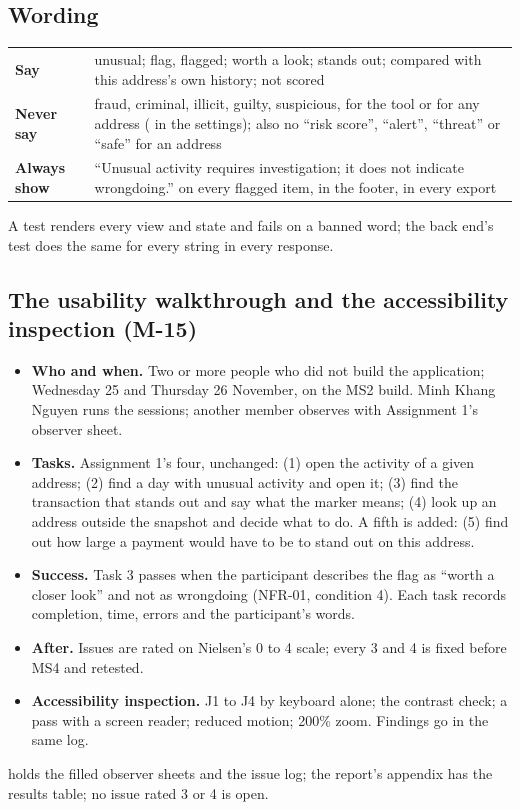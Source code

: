 \subsection{Wording}
\label{sec:wording}

\begin{center}
\small
\begin{tabularx}{\textwidth}{@{}L{4.2cm}Y@{}}
\toprule
\textbf{Say} & unusual; flag, flagged; worth a look; stands out; compared with this address's own history; not scored \\
\textbf{Never say} & fraud, criminal, illicit, guilty, suspicious, for the tool or for any address ( in the settings); also no ``risk score'', ``alert'', ``threat'' or ``safe'' for an address \\
\textbf{Always show} & ``Unusual activity requires investigation; it does not indicate wrongdoing.'' on every flagged item, in the footer, in every export \\
\bottomrule
\end{tabularx}
\end{center}

A test renders every view and state and fails on a banned word; the back end's test does the same
for every string in every response.

\subsection{The usability walkthrough and the accessibility inspection (M-15)}
\label{sec:usability}

\begin{itemize}
  \item \textbf{Who and when.} Two or more people who did not build the application; Wednesday 25
    and Thursday 26 November, on the MS2 build. Minh Khang Nguyen runs the sessions; another member
    observes with Assignment 1's observer sheet.
  \item \textbf{Tasks.} Assignment 1's four, unchanged: (1) open the activity of a given address;
    (2) find a day with unusual activity and open it; (3) find the transaction that stands out and
    say what the marker means; (4) look up an address outside the snapshot and decide what to do.
    A fifth is added: (5) find out how large a payment would have to be to stand out on this
    address.
  \item \textbf{Success.} Task 3 passes when the participant describes the flag as ``worth a
    closer look'' and not as wrongdoing (NFR-01, condition 4). Each task records completion, time,
    errors and the participant's words.
  \item \textbf{After.} Issues are rated on Nielsen's 0 to 4 scale; every 3 and 4 is fixed before
    MS4 and retested.
  \item \textbf{Accessibility inspection.} J1 to J4 by keyboard alone; the contrast check; a pass
    with a screen reader; reduced motion; 200\% zoom. Findings go in the same log.
\end{itemize}

\begin{done}
 holds the filled observer sheets and the issue log; the report's appendix has
the results table; no issue rated 3 or 4 is open.
\end{done}
